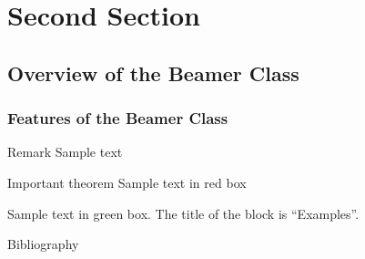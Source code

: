 \documentclass[usenames,dvipsnames,aspectratio=149,8pt]{beamer}
\begin{document}
\section{Second Section}
\subsection{Overview of the Beamer Class}
\frame
{
  \frametitle{Features of the Beamer Class}

    \begin{block}{Remark}
    Sample text
    \end{block}
    
    \begin{alertblock}{Important theorem}
    Sample text in red box
    \end{alertblock}
    
    \begin{examples}
    Sample text in green box. The title of the block is ``Examples''. \cite{article1}
    \end{examples}

}
\nocite{*}
\begin{frame}[allowframebreaks]{Bibliography}
\printbibliography
\end{frame}
\end{document}
